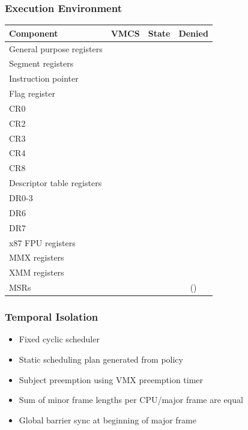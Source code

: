 \documentclass[xcolor={dvipsnames}]{beamer}
\begin{document}
\begin{frame}\frametitle{Execution Environment}
\begin{footnotesize}
\begin{table}[h]
	\centering
	\begin{tabular}{l|c|c|c}
		\textbf{Component} & \textbf{VMCS} & \textbf{State} & \textbf{Denied} \\
		\hline
		General purpose registers  & & \checkmark \\
		Segment registers          & \checkmark & \\
		Instruction pointer        & \checkmark & \\
		Flag register              & \checkmark & \\
		CR0                        & \checkmark & \\
		CR2                        & & \checkmark \\
		CR3                        & \checkmark & \\
		CR4                        & \checkmark & \\
		CR8                        & & & \checkmark \\
		Descriptor table registers & \checkmark & \\
		DR0-3                      & & & \checkmark \\
		DR6                        & & & \checkmark \\
		DR7                        & & & \checkmark \\
		x87 FPU registers          & & & \checkmark \\
		MMX registers              & & & \checkmark \\
		XMM registers              & & & \checkmark \\
		MSRs                       & & & (\checkmark) \\
	\end{tabular}
\end{table}
\end{footnotesize}
\end{frame}

\begin{frame}\frametitle{Temporal Isolation}
\begin{itemize}
	\item Fixed cyclic scheduler
	\item Static scheduling plan generated from policy
	\item Subject preemption using VMX preemption timer
	\item Sum of minor frame lengths per CPU/major frame are equal
	\item Global barrier sync at beginning of major frame
\end{itemize}
\end{frame}
\end{document}
